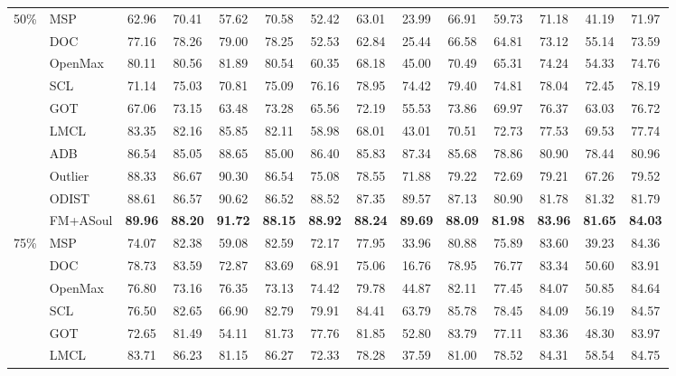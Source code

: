 \documentclass[11pt]{article}
\begin{document}
\begin{table}[t]
\begin{tabular}{cl|cccc|cccc|cccc}
\midrule
\midrule
\multirow{10}{*}{50\%} 
    & MSP & 62.96 & 70.41 & 57.62 & 70.58 & 52.42 & 63.01 & 23.99 & 66.91 & 59.73 & 71.18 & 41.19 & 71.97\\
    & DOC & 77.16 & 78.26 & 79.00 & 78.25 & 52.53 & 62.84 & 25.44 & 66.58 & 64.81 & 73.12 & 55.14 & 73.59 \\
    & OpenMax & 80.11 & 80.56 & 81.89 & 80.54 & 60.35 & 68.18 & 45.00 & 70.49 & 65.31 & 74.24 & 54.33 & 74.76 \\
    & SCL & 71.14 & 75.03 & 70.81 & 75.09 & 76.16 & 78.95 & 74.42 & 79.40 & 74.81 & 78.04 & 72.45 & 78.19 \\
    & GOT & 67.06 & 73.15 & 63.48 & 73.28 & 65.56 & 72.19 & 55.53 & 73.86 & 69.97 & 76.37 & 63.03 & 76.72 \\
    & LMCL & 83.35 & 82.16 & 85.85 & 82.11 & 58.98 & 68.01 & 43.01 & 70.51 & 72.73 & 77.53 & 69.53 & 77.74 \\
    & ADB & 86.54 & 85.05 & 88.65 & 85.00 & 86.40 & 85.83 & 87.34 & 85.68 & 78.86 & 80.90 & 78.44 & 80.96 \\
    & Outlier & 88.33 & 86.67 & 90.30 & 86.54 & 75.08 & 78.55 & 71.88 & 79.22 & 72.69 & 79.21 & 67.26 & 79.52 \\
    & ODIST & 88.61 & 86.57 & 90.62 & 86.52 & 88.52 & 87.35 & 89.57 & 87.13 & 80.90 & 81.78 & 81.32 & 81.79\\
\cmidrule{2-14}
    & FM+ASoul & \textbf{89.96} & \textbf{88.20} & \textbf{91.72} & \textbf{88.15} & \textbf{88.92} & \textbf{88.24} & \textbf{89.69} & \textbf{88.09} & \textbf{81.98} & \textbf{83.96} & \textbf{81.65} & \textbf{84.03}\\
\midrule
\midrule
\multirow{10}{*}{75\%} 
    & MSP & 74.07 & 82.38 & 59.08 & 82.59 & 72.17 & 77.95 & 33.96 & 80.88 & 75.89 & 83.60 & 39.23 & 84.36\\
    & DOC & 78.73 & 83.59 & 72.87 & 83.69 & 68.91 & 75.06 & 16.76 & 78.95 & 76.77 & 83.34 & 50.60 & 83.91 \\
    & OpenMax & 76.80 & 73.16 & 76.35 & 73.13 & 74.42 & 79.78 & 44.87 & 82.11 & 77.45 & 84.07 & 50.85 & 84.64 \\
    & SCL & 76.50 & 82.65 & 66.90 & 82.79 & 79.91 & 84.41 & 63.79 & 85.78 & 78.45 & 84.09 & 56.19 & 84.57 \\
    & GOT & 72.65 & 81.49 & 54.11 & 81.73 & 77.76 & 81.85 & 52.80 & 83.79 & 77.11 & 83.36 & 48.30 & 83.97\\
    & LMCL & 83.71 & 86.23 & 81.15 & 86.27 & 72.33 & 78.28 & 37.59 & 81.00 & 78.52 & 84.31 & 58.54 & 84.75 \\

\end{tabular}
\end{table}
\end{document}
